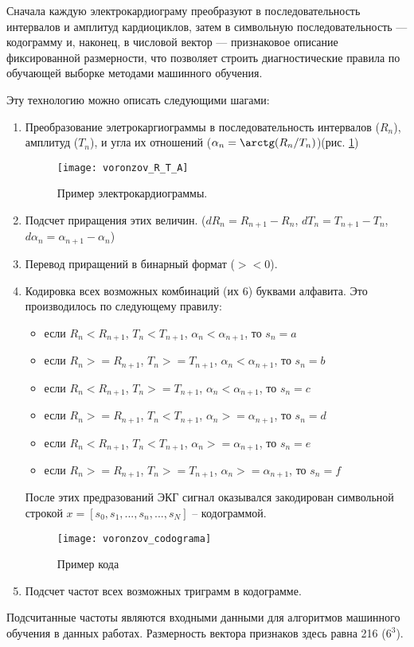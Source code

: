 Сначала каждую электрокардиограму преобразуют в последовательность интервалов и амплитуд кардиоциклов, затем в символьную последовательность — кодограмму и, наконец, в числовой вектор — признаковое описание фиксированной размерности, что позволяет строить диагностические правила по обучающей выборке методами машинного обучения.

Эту технологию можно описать следующими шагами:
\begin{enumerate}
	\item Преобразование элетрокаргиограммы в последовательность интервалов ($R_n$), амплитуд ($T_n$), и угла их отношений ($\alpha_n=\arctg(R_n/T_n)$)(рис. \ref{ris:voronzov_R_T_A})
	
	\begin{figure}[h!]
		\begin{center}
			\texttt{[image: voronzov\_R\_T\_A]}
			\caption{Пример электрокардиограммы.}
			\label{ris:voronzov_R_T_A}
		\end{center}
	\end{figure}
	\item Подсчет приращения этих величин. ($dR_n = R_{n+1} - R_{n}$, $dT_n = T_{n+1} - T_{n}$,$d\alpha_n = \alpha_{n+1} - \alpha_{n}$)
	\item Перевод приращений в бинарный формат ($><0$).
	\item Кодировка  всех возможных комбинаций (их 6) буквами алфавита. Это производилось по следующему правилу:
	\begin{itemize}
		\item если $R_n<R_{n+1}$, $T_n<T_{n+1}$, $\alpha_n<\alpha_{n+1}$, то $s_n=a$
		\item если $R_n>=R_{n+1}$, $T_n>=T_{n+1}$, $\alpha_n<\alpha_{n+1}$, то $s_n=b$		
		\item если $R_n<R_{n+1}$, $T_n>=T_{n+1}$, $\alpha_n<\alpha_{n+1}$, то $s_n=c$		
		\item если $R_n>=R_{n+1}$, $T_n<T_{n+1}$, $\alpha_n>=\alpha_{n+1}$, то $s_n=d$		
		\item если $R_n<R_{n+1}$, $T_n<T_{n+1}$, $\alpha_n>=\alpha_{n+1}$, то $s_n=e$		
		\item если $R_n>=R_{n+1}$, $T_n>=T_{n+1}$, $\alpha_n>=\alpha_{n+1}$, то $s_n=f$		
	\end{itemize}
	После этих предразований ЭКГ сигнал оказывался закодирован символьной строкой $x = [s_0, s_1, ...,s_n, ..., s_N]$ -- кодограммой.

	\begin{figure}[h]
		\begin{center}
			\texttt{[image: voronzov\_codograma]}
			\caption{Пример кода}
			\label{ris:voronzov_codograma}
		\end{center}
	\end{figure}
	\item Подсчет частот всех возможных триграмм в кодограмме.
\end{enumerate}
Подсчитанные частоты являются входными данными для алгоритмов машинного обучения в данных работах. Размерность вектора признаков здесь равна 216 ($6^3$).
 
